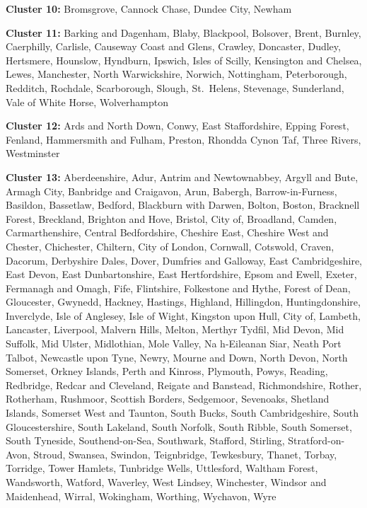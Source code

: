 \documentclass[]{interact}
\theoremstyle{plain}%
\theoremstyle{definition}
\theoremstyle{remark}
\begin{document}
\textbf{Cluster 10: } Bromsgrove, Cannock Chase, Dundee City, Newham

\textbf{Cluster 11: } Barking and Dagenham, Blaby, Blackpool, Bolsover,
Brent, Burnley, Caerphilly, Carlisle, Causeway Coast and Glens, Crawley,
Doncaster, Dudley, Hertsmere, Hounslow, Hyndburn, Ipswich, Isles of
Scilly, Kensington and Chelsea, Lewes, Manchester, North Warwickshire,
Norwich, Nottingham, Peterborough, Redditch, Rochdale, Scarborough,
Slough, St.~Helens, Stevenage, Sunderland, Vale of White Horse,
Wolverhampton

\textbf{Cluster 12: } Ards and North Down, Conwy, East Staffordshire,
Epping Forest, Fenland, Hammersmith and Fulham, Preston, Rhondda Cynon
Taf, Three Rivers, Westminster

\textbf{Cluster 13: } Aberdeenshire, Adur, Antrim and Newtownabbey,
Argyll and Bute, Armagh City, Banbridge and Craigavon, Arun, Babergh,
Barrow-in-Furness, Basildon, Bassetlaw, Bedford, Blackburn with Darwen,
Bolton, Boston, Bracknell Forest, Breckland, Brighton and Hove, Bristol,
City of, Broadland, Camden, Carmarthenshire, Central Bedfordshire,
Cheshire East, Cheshire West and Chester, Chichester, Chiltern, City of
London, Cornwall, Cotswold, Craven, Dacorum, Derbyshire Dales, Dover,
Dumfries and Galloway, East Cambridgeshire, East Devon, East
Dunbartonshire, East Hertfordshire, Epsom and Ewell, Exeter, Fermanagh
and Omagh, Fife, Flintshire, Folkestone and Hythe, Forest of Dean,
Gloucester, Gwynedd, Hackney, Hastings, Highland, Hillingdon,
Huntingdonshire, Inverclyde, Isle of Anglesey, Isle of Wight, Kingston
upon Hull, City of, Lambeth, Lancaster, Liverpool, Malvern Hills,
Melton, Merthyr Tydfil, Mid Devon, Mid Suffolk, Mid Ulster, Midlothian,
Mole Valley, Na h-Eileanan Siar, Neath Port Talbot, Newcastle upon Tyne,
Newry, Mourne and Down, North Devon, North Somerset, Orkney Islands,
Perth and Kinross, Plymouth, Powys, Reading, Redbridge, Redcar and
Cleveland, Reigate and Banstead, Richmondshire, Rother, Rotherham,
Rushmoor, Scottish Borders, Sedgemoor, Sevenoaks, Shetland Islands,
Somerset West and Taunton, South Bucks, South Cambridgeshire, South
Gloucestershire, South Lakeland, South Norfolk, South Ribble, South
Somerset, South Tyneside, Southend-on-Sea, Southwark, Stafford,
Stirling, Stratford-on-Avon, Stroud, Swansea, Swindon, Teignbridge,
Tewkesbury, Thanet, Torbay, Torridge, Tower Hamlets, Tunbridge Wells,
Uttlesford, Waltham Forest, Wandsworth, Watford, Waverley, West Lindsey,
Winchester, Windsor and Maidenhead, Wirral, Wokingham, Worthing,
Wychavon, Wyre
\end{document}
